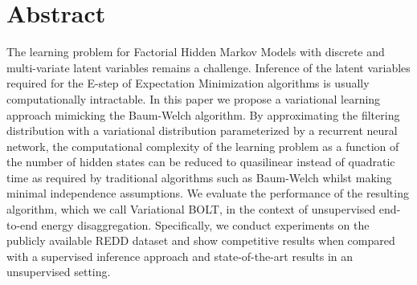 
\section{Abstract}
The learning problem for Factorial Hidden Markov Models with discrete and multi-variate latent variables remains a challenge. Inference of the latent variables required for the E-step of Expectation Minimization algorithms is usually computationally intractable. In this paper we propose a variational learning approach mimicking the Baum-Welch algorithm. By approximating the filtering distribution with a variational distribution parameterized by a recurrent neural network, the computational complexity of the learning problem as a function of the number of hidden states can be reduced to quasilinear instead of quadratic time as required by traditional algorithms such as Baum-Welch whilst making minimal independence assumptions. We evaluate the performance of the resulting algorithm, which we call Variational BOLT, in the context of unsupervised end-to-end energy disaggregation. Specifically, we conduct experiments on the publicly available REDD dataset and show competitive results when compared with a supervised inference approach and state-of-the-art results in an unsupervised setting.


